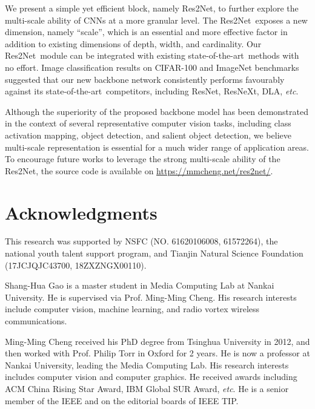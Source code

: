 \documentclass[10pt,journal,cspaper,compsoc]{IEEEtran}
\newcommand{\ourM}{{Res2Net}}
\newcommand{\sArt}{{state-of-the-art~}}
\def\etc{\emph{etc}}
\begin{document}
We present a simple yet efficient block, namely \ourM,
to further explore the multi-scale ability of CNNs at a more granular level.
The \ourM~exposes a new dimension, namely ``scale'',
which is an essential and more effective factor in addition to
existing dimensions of depth, width, and cardinality.
Our \ourM~module can be integrated with existing \sArt methods with no effort.
Image classification results on CIFAR-100 and ImageNet benchmarks
suggested that our new backbone network consistently performs favourably 
against its \sArt competitors,
including ResNet, ResNeXt, DLA, \etc.


Although the superiority of the proposed backbone model has been demonstrated
in the context of several representative computer vision tasks,
including class activation mapping, object detection,
and salient object detection,
we believe multi-scale representation is essential for a much wider range of
application areas.
To encourage future works to leverage the strong multi-scale ability of
the \ourM,
the source code is available on \url{https://mmcheng.net/res2net/}.


\section*{Acknowledgments}
This research was supported by NSFC (NO. 61620106008, 61572264),
the national youth talent support program, and
Tianjin Natural Science Foundation (17JCJQJC43700, 18ZXZNGX00110).



{\small


}



\newcommand{\AddPhoto}[1]{{\texttt{[image: Authors/\#1]}}}

\ifdefined \GramaCheck
  \newcommand{\AuthorBio}[3]{#2 #3}
\else
  \newcommand{\AuthorBio}[3]{\vspace{-.2in}\begin{IEEEbiography}[\AddPhoto{#1}]{#2}#3\end{IEEEbiography}}
\fi


\AuthorBio{shgao}{Shang-Hua Gao}{
is a master student in Media Computing Lab at Nankai University.
He is supervised via Prof. Ming-Ming Cheng.
His research interests include computer vision,  machine learning, 
and radio vortex wireless communications.
}


\AuthorBio{cmm}{Ming-Ming Cheng}{
received his PhD degree from Tsinghua University in 2012,
and then worked with Prof. Philip Torr in Oxford for 2 years.
He is now a professor at Nankai University, leading the
Media Computing Lab.
His research interests includes computer vision and computer graphics.
He received awards including ACM China Rising Star Award,
IBM Global SUR Award, \etc.
He is a senior member of the IEEE and on the editorial boards of IEEE TIP.
}
\end{document}
